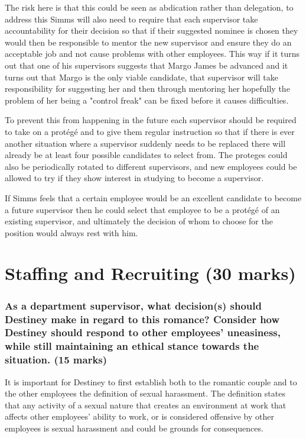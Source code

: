 \documentclass[12pt,titlepage]{article}
\begin{document}
The risk here is that this could be seen as abdication rather than delegation, to address this Simms will also need to require that each supervisor take accountability for their decision so that if their suggested nominee is chosen they would then be responsible to mentor the new supervisor and ensure they do an acceptable job and not cause problems with other employees. This way if it turns out that one of his supervisors suggests that Margo James be advanced and it turns out that Margo is the only viable candidate, that supervisor will take responsibility for suggesting her and then through mentoring her hopefully the problem of her being a "control freak" can be fixed before it causes difficulties.  

To prevent this from happening in the future each supervisor should be required to take on a protégé and to give them regular instruction so that if there is ever another situation where a supervisor suddenly needs to be replaced there will already be at least four possible candidates to select from. The proteges could also be periodically rotated to different supervisors, and new employees could be allowed to try if they show interest in studying to become a supervisor. 

If Simms feels that a certain employee would be an excellent candidate to become a future supervisor then he could select that employee to be a protégé of an existing supervisor, and ultimately the decision of whom to choose for the position would always rest with him. 

\part{Staffing and Recruiting (30 marks)}
\setcounter{section}{0}

\section{As a department supervisor, what decision(s) should Destiney make in regard to this romance? Consider how Destiney should respond to other employees' uneasiness, while still maintaining an ethical stance towards the situation. (15 marks)}

It is important for Destiney to first establish both to the romantic couple and to the other employees the definition of sexual harassment. The definition states that any activity of a sexual nature that creates an environment at work that affects other employees' ability to work, or is considered offensive by other employees is sexual harassment and could be grounds for consequences. 
\end{document}
